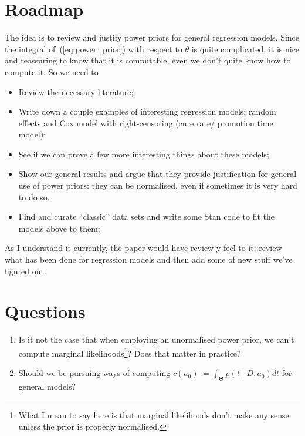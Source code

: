 \documentclass[a4paper, notitlepage, 11pt]{article}
\begin{document}
\section{Roadmap}
The idea is to review and justify power priors for general regression models.
Since the integral of~(\ref{eq:power_prior}) with respect to $\theta$ is quite complicated, it is nice and reassuring to know that it is computable, even we don't quite know how to compute it.
So we need to
\begin{itemize}
 \item Review the necessary literature;
 \item Write down a couple examples of interesting regression models: random effects and Cox model with right-censoring (cure rate/ promotion time model);
 \item See if we can prove a few more interesting things about these models;
 \item Show our general results and argue that they provide justification for general use of power priors: they can be normalised, even if sometimes it is very hard to do so.
 \item Find and curate ``classic'' data sets and write some Stan code to fit the models above to them;
\end{itemize}
As I understand it currently, the paper would have review-y feel to it: review what has been done for regression models and then add some of new stuff we've figured out.

\section{Questions}

\begin{enumerate}
 \item Is it not the case that when employing an unormalised power prior, we can't compute marginal likelihoods\footnote{What I mean to say here is that marginal likelihoods don't make any sense unless the prior is properly normalised.}? Does that matter in practice?
 \item Should we be pursuing ways of computing $c(a_0) := \int_{\boldsymbol \Theta} p(t \mid D, a_0)dt$ for general models? 
\end{enumerate}



\end{document}
